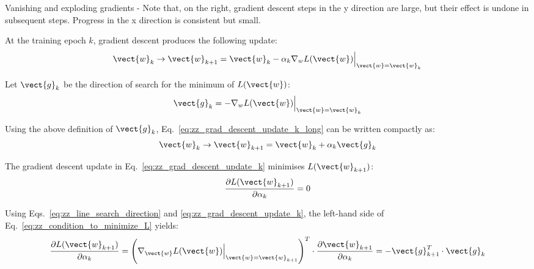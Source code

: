 \begin{frame}[t,allowframebreaks]{
    Vanishing and exploding gradients -}
    {\scriptsize
    Note that, on the right, \gls{gradient descent}
    steps in the y direction are large, but their effect is undone in subsequent steps.
    Progress in the x direction is consistent but small.\\
    }

    \framebreak

    At the training \gls{epoch} $k$, 
     \gls{gradient descent}
    produces the following update:
    \begin{equation}
        \vect{w}_{k} \rightarrow 
          \vect{w}_{k+1} =  
          \vect{w}_{k} - \alpha_{k} \nabla_{w}{L(\vect{w})}
            \Big\rvert_{\vect{w} = \vect{w}_{k}}
        \label{eq:zz_grad_descent_update_k_long}    
    \end{equation}
    
    Let $\vect{g}_k$ be the 
    direction of search for the minimum of $L(\vect{w})$: 
    \begin{equation}
       \vect{g}_k = - \nabla_{w}{L(\vect{w})}
            \Big\rvert_{\vect{w} = \vect{w}_{k}}
        \label{eq:zz_line_search_direction}    
    \end{equation}
    
    Using the above definition of $\vect{g}_k$, 
    Eq.~\ref{eq:zz_grad_descent_update_k_long} can be written compactly as:
    \begin{equation}
        \vect{w}_{k} \rightarrow 
          \vect{w}_{k+1} =  
          \vect{w}_{k} + \alpha_{k} \vect{g}_{k}
        \label{eq:zz_grad_descent_update_k}    
    \end{equation}
    
    The \gls{gradient descent} update in 
    Eq.~\ref{eq:zz_grad_descent_update_k} minimises
    $L(\vect{w}_{k+1})$:
    \begin{equation}
        \frac{\partial L(\vect{w}_{k+1})}{\partial \alpha_{k}} = 0
        \label{eq:zz_condition_to_minimize_L}    
    \end{equation}
    
    Using Eqs.~\ref{eq:zz_line_search_direction} 
    and \ref{eq:zz_grad_descent_update_k}, 
    the left-hand side of Eq.~\ref{eq:zz_condition_to_minimize_L}
    yields:
    \begin{equation}
          \frac{\partial L(\vect{w}_{k+1})}{\partial \alpha_{k}} =
           \Bigg(\nabla_{\vect{w}} L(\vect{w})
             \Big\rvert_{\vect{w} = \vect{w}_{k+1}} \Bigg)^T \cdot
           \frac{\partial \vect{w}_{k+1}}{\partial \alpha_{k}} =
           - \vect{g}_{k+1}^T \cdot \vect{g}_{k}
        \label{eq:zz_grad_L_wrt_a_k}    
    \end{equation}
    

\end{frame}
